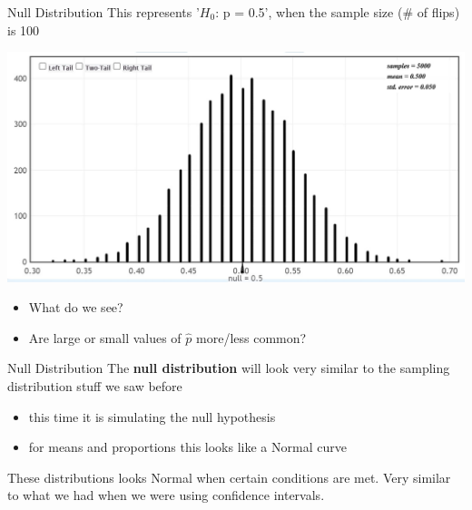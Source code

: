\documentclass{beamer}
\begin{document}
\begin{frame}{Null Distribution}
This represents '$H_0$: p = 0.5', when the sample size (\# of flips) is 100
\begin{center}
    \includegraphics[scale=.55]{img/coin_null_distr2.jpg}
\end{center}
\begin{itemize}
    \item What do we see?
    \item Are large or small values of $\hat{p}$ more/less common?
\end{itemize}
\end{frame}

\begin{frame}{Null Distribution}
The \textbf{null distribution} will look very similar to the sampling distribution stuff we saw before
\begin{itemize}
    \item this time it is simulating the null hypothesis
    \item for means and proportions this looks like a Normal curve
\end{itemize} \vspace{8mm}

These distributions looks Normal when certain conditions are met. Very similar to what we had when we were using confidence intervals.
\end{frame}
\end{document}
